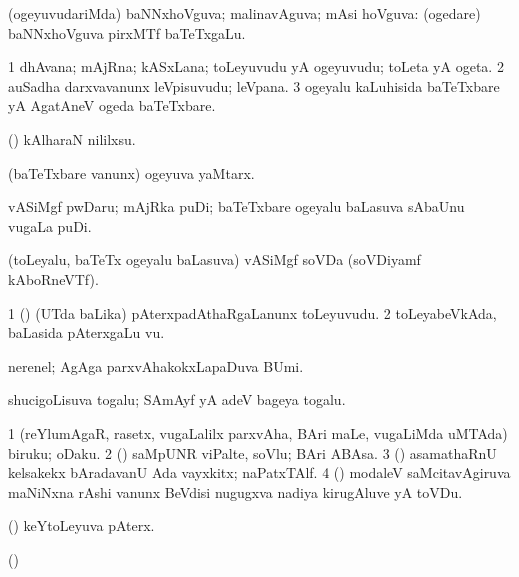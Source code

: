 {\bentry 
{} 
\gl{\gu}
\expl{}
\bmng
(ogeyuvudariMda) baNNxhoVguva; malinavAguva; mAsi hoVguva:  (ogedare) baNNxhoVguva pirxMTf baTeTxgaLu. 
\emng
\eentry

\bentry 
{} 
\gl{\nA}
\expl{}
\bmng
\bnum
\num{1} dhAvana; mAjRna; kASxLana; toLeyuvudu yA ogeyuvudu; toLeta yA ogeta. 
\num{2} auSadha darxvavanunx leVpisuvudu; leVpana. 
\num{3} ogeyalu kaLuhisida baTeTxbare yA AgatAneV ogeda baTeTxbare. 
\enum
\emng

\noindent 
\gl{\pagu}
\expl{}
\bmng
{} (\ashi) kAlharaN nililxsu. 
\emng
\eentry

\bentry
{} 
\gl{\nA}
\expl{}
\bmng
(baTeTxbare \mo vanunx) ogeyuva yaMtarx. 
\emng
\eentry

\bentry
{} 
\gl{\nA}
\expl{}
\bmng
vASiMgf pwDaru; mAjRka puDi; baTeTxbare ogeyalu baLasuva sAbaUnu \mo vugaLa puDi. 
\emng
\eentry

\bentry
{} 
\gl{\nA}
\expl{}
\bmng
(toLeyalu, baTeTx ogeyalu baLasuva) vASiMgf soVDa (soVDiyamf kAboRneVTf). 
\emng
\eentry

\bentry
{} 
\gl{\nA}
\expl{}
\bmng
\bnum
\num{1} (\birx) (UTda baLika) pAterxpadAthaRgaLanunx toLeyuvudu. 
\num{2} toLeyabeVkAda, baLasida pAterxgaLu \mo vu. 
\enum
\emng
\eentry

\bentry
{} 
\gl{\nA}
\expl{}
\bmng
nerenel; AgAga parxvAhakokxLapaDuva BUmi. 
\emng
\eentry

\bentry
{} 
\gl{\nA}
\expl{}
\bmng
shucigoLisuva togalu; SAmAyf yA adeV bageya togalu. 
\emng
\eentry

\bentry
{} 
\bmng
\bnum
\num{1} (reYlumAgaR, rasetx, \mo vugaLalilx parxvAha, BAri maLe, \mo vugaLiMda uMTAda) biruku; oDaku. 
\num{2} (\AmA) saMpUNR viPalte, soVlu; BAri ABAsa. 
\num{3} (\ashi) asamathaRnU kelsakekx bAradavanU Ada vayxkitx; naPatxTAlf. 
\num{4} (\BUvi) modaleV saMcitavAgiruva maNiNxna rAshi \mo vanunx BeVdisi nugugxva nadiya kirugAluve yA toVDu. 
\enum
\emng
\eentry

\bentry
{} 
\gl{\nA}
\expl{}
\bmng
(\pArxparx) keYtoLeyuva pAterx. 
\emng
\eentry

\bentry
{} 
\gl{\nA}
\expl{}
\bmng
(\ame)  
\emng
\eentry

}
